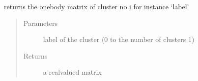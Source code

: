 \documentclass[letterpaper,10pt,english]{sphinxmanual}
\begin{document}

\begin{fulllineitems}
\label{\detokenize{functions:pyqcm.interactions}}
\sphinxAtStartPar
returns the one\sphinxhyphen{}body matrix of cluster no i for instance ‘label’
\begin{quote}\begin{description}
\item[{Parameters}] \leavevmode
\sphinxAtStartPar
{} \textendash{} label of the cluster (0 to the number of clusters \sphinxhyphen{} 1)

\item[{Returns}] \leavevmode
\sphinxAtStartPar
a real\sphinxhyphen{}valued matrix

\end{description}\end{quote}

\end{fulllineitems}

\end{document}

